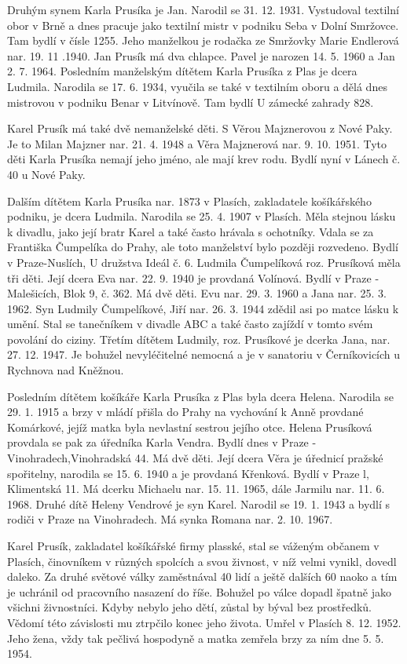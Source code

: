 \documentclass[../dejiny-rodu-prusiku.tex]{subfiles}
\begin{document}
Druhým synem Karla Prusíka je Jan. Narodil se 31. 12. 1931. Vystudoval textilní obor v Brně a dnes pracu­je jako textilní mistr v podniku Seba v Dolní Smržovce. Tam bydlí v čísle 1255. Jeho manželkou je rodačka ze Smržovky Marie Endlerová nar. 19. 11 .1940. Jan Pru­sík má dva chlapce. Pavel je narozen 14. 5. 1960 a Jan 2. 7. 1964. Posledním manželským dítětem Karla Prusíka z Plas je dcera Ludmila. Narodila se 17. 6. 1934, vyučila se také v textilním oboru a dělá dnes mistrovou v podniku Benar v Litvínově. Tam bydlí U zámecké zahrady 828.

Karel Prusík má také dvě nemanželské děti. S Věrou Majznerovou z Nové Paky. Je to Milan Majzner nar. 21. 4. 1948 a Věra Majznerová nar. 9. 10. 1951. Tyto děti Karla Prusíka nemají jeho jméno, ale mají krev rodu. Bydlí nyní v Lánech č. 40 u Nové Paky.

Dalším dítětem Karla Prusíka nar. 1873 v Plasích, zakladatele košíkářského podniku, je dcera Ludmila. Narodila se 25. 4. 1907 v Plasích. Měla stejnou lásku k divadlu, jako její bratr Karel a také často hrávala s ochotníky. Vdala se za Františka Čumpelíka do Prahy, ale toto man­želství bylo později rozvedeno. Bydlí v Praze-Nuslích,  U družstva Ideál č. 6. Ludmila Čumpelíková roz. Prusíková měla tři děti. Její dcera Eva nar. 22. 9. 1940 je provdaná Volínová. Bydlí v Praze - Malešicích, Blok 9, č. 362. Má dvě děti. Evu nar. 29. 3. 1960 a Jana nar. 25. 3. 1962. Syn Ludmily Čumpelíkové, Jiří nar. 26. 3. 1944 zdědil asi po matce lásku k umění. Stal se tanečníkem v divadle ABC a také často zajíždí v tomto svém povolání do ciziny. Třetím dítětem Ludmily, roz. Prusíkové je dcerka Jana, nar. 27. 12. 1947. Je bohužel nevyléčitelné nemocná a je v sanatoriu v Černíkovicích u Rychnova nad Kněžnou.

Posledním dítětem košíkáře Karla Prusíka z Plas byla dcera Helena. Narodila se 29. 1. 1915 a brzy v mládí přišla do Prahy na vychování k Anně provdané Komárkové, jejíž matka byla nevlastní sestrou jejího otce. Helena Prusíková provdala se pak za úředníka Karla Vendra. Bydlí dnes v Praze -Vinohradech,Vinohradská 44. Má dvě děti. Její dcera Věra je úřednicí pražské spořitelny, narodila se 15. 6. 1940 a je provdaná Křenková. Bydlí v Praze l, Klimentská 11. Má dcerku Michaelu nar. 15.  11. 1965, dále Jarmilu nar. 11. 6. 1968. Druhé dítě Heleny Vendrové je syn Karel. Narodil se 19. 1. 1943 a bydlí s rodiči v Praze na Vinohradech. Má synka Romana nar. 2. 10. 1967.

Karel Prusík, zakladatel košíkářské firmy plasské, stal se váženým občanem v Plasích, činovníkem v růz­ných spolcích a svou živnost, v níž velmi vynikl, dovedl daleko. Za druhé světové války zaměstnával 40 lidí a ještě dalších 60 naoko a tím je uchránil od pracovního nasazení do říše. Bohužel po válce do­padl špatně jako všichni živnostníci. Kdyby nebylo jeho dětí, zůstal by býval bez prostředků. Vědomí této závislosti mu ztrpčilo konec jeho života. Umřel v Plasích 8. 12. 1952. Jeho žena, vždy tak pečlivá hos­podyně a matka zemřela brzy za ním dne 5. 5. 1954.
\end{document}
